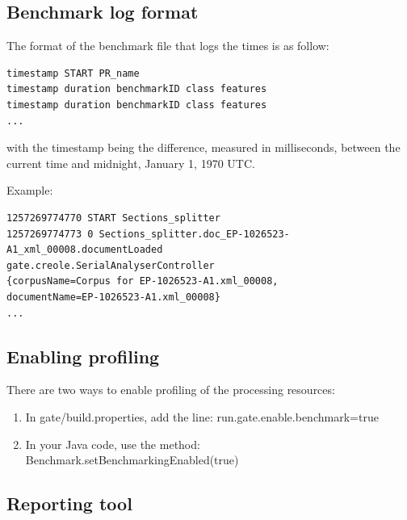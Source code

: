 \subsection{Benchmark log format}

The format of the benchmark file that logs the times is as follow:

\begin{small}\begin{verbatim}
timestamp START PR_name
timestamp duration benchmarkID class features
timestamp duration benchmarkID class features
...
\end{verbatim}\end{small}

with the timestamp being the difference, measured in milliseconds, between the current time and midnight, January 1, 1970 UTC.

Example:

\begin{small}\begin{verbatim}
1257269774770 START Sections_splitter
1257269774773 0 Sections_splitter.doc_EP-1026523-A1_xml_00008.documentLoaded
gate.creole.SerialAnalyserController
{corpusName=Corpus for EP-1026523-A1.xml_00008,
documentName=EP-1026523-A1.xml_00008}
...
\end{verbatim}\end{small}

\subsection{Enabling profiling}

There are two ways to enable profiling of the processing resources:

\begin{enumerate}
  \item In gate/build.properties, add the line:
run.gate.enable.benchmark=true

  \item In your Java code, use the method:
Benchmark.setBenchmarkingEnabled(true)
\end{enumerate}

\subsection{Reporting tool }

